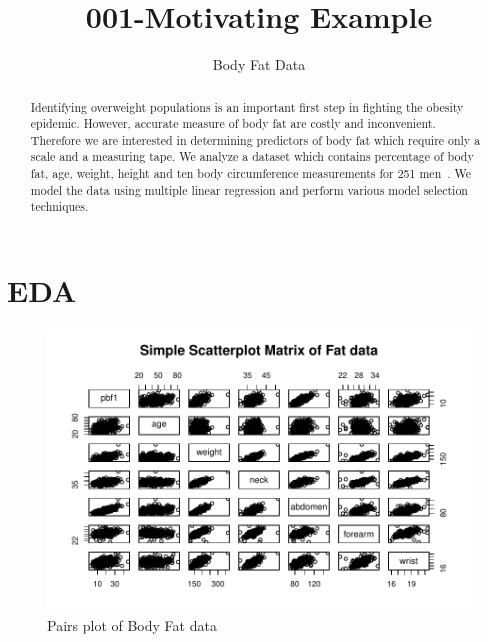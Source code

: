 \documentclass[11pt,letter]{article}\usepackage[]{graphicx}\usepackage[]{color}
\makeatletter
\def\maxwidth{ %
  \ifdim\Gin@nat@width>\linewidth
    \linewidth
  \else
    \Gin@nat@width
  \fi
}
\newenvironment{knitrout}{}{} %
\makeatother
\begin{document}
\pagestyle{fancy}

\title{001-Motivating Example}
\author{Body Fat Data}
\maketitle







\begin{abstract}
Identifying overweight populations is an important first step in fighting the obesity epidemic. However, accurate measure of body fat are costly and inconvenient. Therefore we are interested in determining predictors of body fat which require only a scale and a measuring tape. We analyze a dataset which contains percentage of body fat, age, weight, height and ten body circumference measurements for 251 men~\citep{penrose1985generalized,johnson1996fitting,mfp}. We model the data using multiple linear regression and perform various model selection techniques.
\end{abstract}


\section{EDA}



\begin{knitrout}
\color{fgcolor}\begin{figure}[h]

{\centering \includegraphics[width=\maxwidth]{figure/pairs-1} 

}

\caption[Pairs plot of Body Fat data]{Pairs plot of Body Fat data}\label{fig:pairs}
\end{figure}


\end{knitrout}
\end{document}
